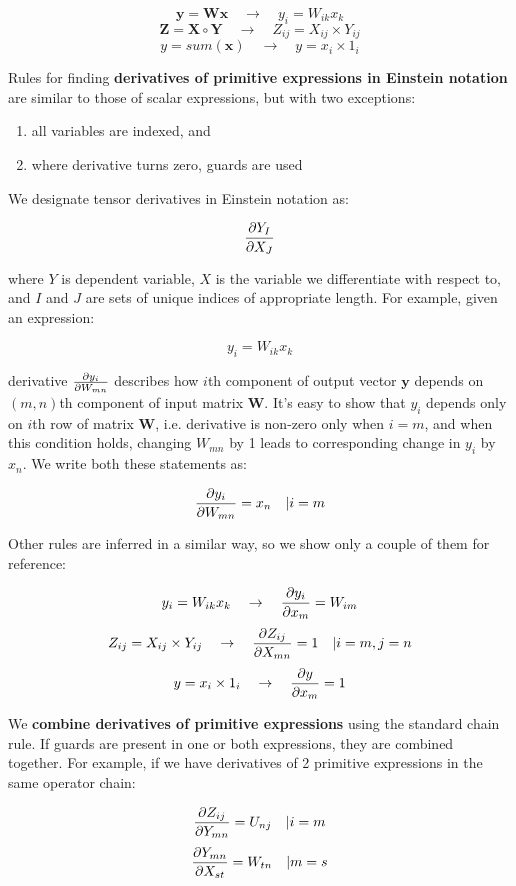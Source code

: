 \documentclass[conference]{IEEEtran}
\begin{document}
$$\pmb{y} = \pmb{Wx} \quad \rightarrow \quad y_i = W_{ik}x_k$$
$$\pmb{Z} = \pmb{X} \circ \pmb{Y} \quad \rightarrow \quad Z_{ij} = X_{ij} \times Y_{ij}$$
$$y = sum(\pmb{x}) \quad \rightarrow \quad y = x_i \times 1_i$$


Rules for finding \textbf{derivatives of primitive expressions in
  Einstein notation} are similar to those of scalar expressions, but
with two exceptions:

\begin{enumerate}
\item all variables are indexed, and
\item where derivative turns zero, guards are used
\end{enumerate}

We designate tensor derivatives in Einstein notation as:

$$\pdv{Y_I}{X_J}$$

where $Y$ is dependent variable, $X$ is the variable we differentiate
with respect to, and $I$ and $J$ are sets of unique indices of
appropriate length. For example, given an expression:

$$y_i = W_{ik}x_k$$

derivative $\pdv{y_i}{W_{mn}}$ describes how $i$th component of output
vector $\pmb{y}$ depends on $(m, n)$th component of input matrix
$\pmb{W}$. It's easy to show that $y_i$ depends only on $i$th row of
matrix $\pmb{W}$, i.e. derivative is non-zero only when $i = m$, and
when this condition holds, changing $W_{mn}$ by 1 leads to
corresponding change in $y_i$ by $x_n$. We write both these statements
as:

$$\pdv{y_i}{W_{mn}} = x_n \quad | i = m$$

Other rules are inferred in a similar way, so we show only a couple of
them for reference:

$$y_i = W_{ik}x_k \quad \rightarrow \quad \pdv{y_i}{x_m} = W_{im}$$
$$Z_{ij} = X_{ij} \times Y_{ij} \quad \rightarrow \quad \pdv{Z_{ij}}{X_{mn}} = 1 \quad | i = m, j = n$$
$$y = x_i \times 1_i \quad \rightarrow \quad \pdv{y}{x_m} = 1$$


We \textbf{combine derivatives of primitive expressions} using the
standard chain rule. If guards are present in one or both expressions,
they are combined together. For example, if we have derivatives of 2
primitive expressions in the same operator chain:

$$\pdv{Z_{ij}}{Y_{mn}} = U_{nj} \quad | i = m$$
$$\pdv{Y_{mn}}{X_{st}} = W_{tn} \quad | m = s$$
\end{document}
